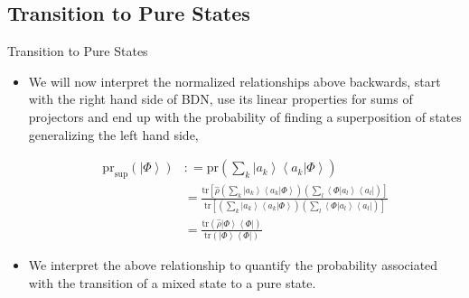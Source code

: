 \documentclass[9pt,handout]{beamer}
\newcommand{\pr}[0]{\text{pr}}
\newcommand{\tr}[0]{\text{tr}}
\begin{document}
\subsection{Transition to Pure States}
\begin{frame}{Transition to Pure States}
\begin{itemize}
\item We will now interpret the normalized relationships above backwards, start with the right hand side of BDN, use its linear properties for sums of projectors and end up with the probability of finding a superposition of states generalizing the left hand side,

\begin{align*}
\pr_{\text{sup}} \left( \left\lvert \Phi \right\rangle \right) & : = \pr \left( \sum_k \left\lvert a_k \right\rangle \left\langle a_k \right\rvert \left. \Phi \right\rangle \right) \\
& = \frac{\tr \left[ \widehat{\rho} \left( \sum_k \left\lvert a_k \right\rangle \left\langle a_k \right\rvert \left. \Phi \right\rangle \right) \left( \sum_l \left\langle \Phi \right\rvert \left. a_l \right\rangle \left\langle a_l \right\rvert \right) \right]}{\tr \left[ \left( \sum_k \left\lvert a_k \right\rangle \left\langle a_k \right\rvert \left. \Phi \right\rangle \right) \left( \sum_l \left\langle \Phi \right\rvert \left. a_l \right\rangle \left\langle a_l \right\rvert \right) \right]} \\
& = \frac{\tr \left( \widehat{\rho} \left\lvert \Phi \right\rangle \left\langle \Phi \right\rvert \right)}{\tr \left( \left\lvert \Phi \right\rangle \left\langle \Phi \right\rvert \right)}
\end{align*}

\item We interpret the above relationship to quantify the probability associated with the transition of a mixed state to a pure state. 
\end{itemize}
\end{frame}
\end{document}
